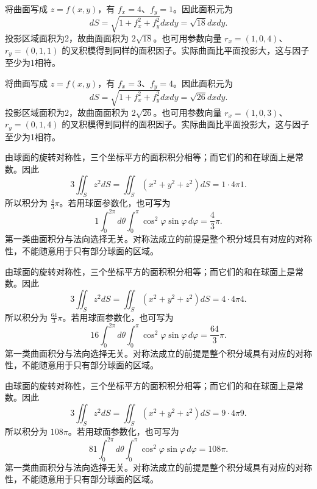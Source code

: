 \documentclass[12pt,fontset=fandol]{ctexart}
\begin{document}
\begin{solve}\label{ans:c43q5}
将曲面写成 $z=f(x,y)$，有 $f_x=4$、$f_y=1$。因此面积元为
\[
dS=\sqrt{1+f_x^2+f_y^2}dxdy=\sqrt{18}dxdy.
\]
投影区域面积为2，故曲面面积为 $2\sqrt{18}$。也可用参数向量 $r_x=(1,0,4)$、$r_y=(0,1,1)$ 的叉积模得到同样的面积因子。实际曲面比平面投影大，这与因子至少为1相符。
\end{solve}

\begin{solve}\label{ans:c43q6}
将曲面写成 $z=f(x,y)$，有 $f_x=3$、$f_y=4$。因此面积元为
\[
dS=\sqrt{1+f_x^2+f_y^2}dxdy=\sqrt{26}dxdy.
\]
投影区域面积为2，故曲面面积为 $2\sqrt{26}$。也可用参数向量 $r_x=(1,0,3)$、$r_y=(0,1,4)$ 的叉积模得到同样的面积因子。实际曲面比平面投影大，这与因子至少为1相符。
\end{solve}

\begin{solve}\label{ans:c43q7}
由球面的旋转对称性，三个坐标平方的面积积分相等；而它们的和在球面上是常数。因此
\[
3\iint_Sz^2dS=\iint_S(x^2+y^2+z^2)dS=1\cdot4\pi1.
\]
所以积分为 $\frac{4}{3}\pi$。若用球面参数化，也可写为
\[
1\int_0^{2\pi}d\theta\int_0^\pi\cos^2\varphi\sin\varphi\,d\varphi=\frac{4}{3}\pi.
\]
第一类曲面积分与法向选择无关。对称法成立的前提是整个积分域具有对应的对称性，不能随意用于只有部分球面的区域。
\end{solve}

\begin{solve}\label{ans:c43q8}
由球面的旋转对称性，三个坐标平方的面积积分相等；而它们的和在球面上是常数。因此
\[
3\iint_Sz^2dS=\iint_S(x^2+y^2+z^2)dS=4\cdot4\pi4.
\]
所以积分为 $\frac{64}{3}\pi$。若用球面参数化，也可写为
\[
16\int_0^{2\pi}d\theta\int_0^\pi\cos^2\varphi\sin\varphi\,d\varphi=\frac{64}{3}\pi.
\]
第一类曲面积分与法向选择无关。对称法成立的前提是整个积分域具有对应的对称性，不能随意用于只有部分球面的区域。
\end{solve}

\begin{solve}\label{ans:c43q9}
由球面的旋转对称性，三个坐标平方的面积积分相等；而它们的和在球面上是常数。因此
\[
3\iint_Sz^2dS=\iint_S(x^2+y^2+z^2)dS=9\cdot4\pi9.
\]
所以积分为 $108\pi$。若用球面参数化，也可写为
\[
81\int_0^{2\pi}d\theta\int_0^\pi\cos^2\varphi\sin\varphi\,d\varphi=108\pi.
\]
第一类曲面积分与法向选择无关。对称法成立的前提是整个积分域具有对应的对称性，不能随意用于只有部分球面的区域。
\end{solve}
\end{document}
